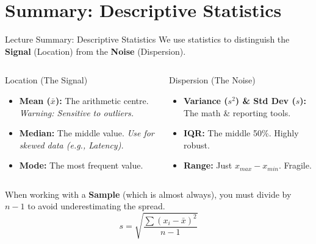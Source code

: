 \section{Summary: Descriptive Statistics}
\begin{frame}[allowframebreaks]{Lecture Summary: Descriptive Statistics}
    \small
    We use statistics to distinguish the \textbf{Signal} (Location) from the \textbf{Noise} (Dispersion).

    \begin{columns}[t]
        \begin{block}{Location (The Signal)}
            \begin{itemize}
                \item \textbf{Mean ($\bar{x}$):} The arithmetic centre. \textit{Warning: Sensitive to outliers.}
                \item \textbf{Median:} The middle value. \textit{Use for skewed data (e.g., Latency).}
                \item \textbf{Mode:} The most frequent value.
            \end{itemize}
        \end{block}

     \begin{block}{Dispersion (The Noise)}
    \begin{itemize}
        \item \textbf{Variance ($s^2$) \& Std Dev ($s$):} The math \& reporting tools.
        \item \textbf{IQR:} The middle 50\%. Highly robust.
        \item \textbf{Range:} Just $x_{max} - x_{min}$. Fragile.
    \end{itemize}
\end{block}
    \end{columns}



        When working with a \textbf{Sample} (which is almost always), you must divide by \textbf{$n-1$} to avoid underestimating the spread.
        \[ s = \sqrt{\frac{\sum(x_i - \bar{x})^2}{n-1}} \]

\end{frame}


